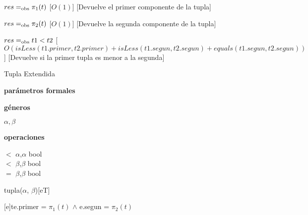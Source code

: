 \begin{Interfaz}
	{$res =_{\mathrm{obs}} \pi_1 (t)$}
	[$O(1)$]
	[Devuelve el primer componente de la tupla]

	{$res =_{\mathrm{obs}} \pi_2 (t)$}
	[$O(1)$]
	[Devuelve la segunda componente de la tupla]

	{$res =_{\mathrm{obs}} t1 < t2$}
	[$O(isLess(t1.primer, t2.primer) + isLess(t1.segun, t2.segun) + equals(t1.segun, t2.segun))$]
	[Devuelve si la primer tupla es menor a la segunda]


	\begin{tad}{Tupla Extendida}
	\parskip=0pt

	\textbf{parámetros formales}\parindent\\
	\parbox{1.7cm}{\textbf{géneros}}$\alpha,\beta$\\
	\parbox{\parindent+1.7cm}{\textbf{operaciones}}\parbox[t]{\textwidth-\parindent-1.7cm}{
		\tadOperacionInline
		{\puntito $<$ \puntito}
		{$\alpha$,$\alpha$}
		{bool}\\
		\tadOperacionInline
		{\puntito $<$ \puntito}
		{$\beta$,$\beta$}
		{bool}\\
		\tadOperacionInline
		{\puntito $=$ \puntito}
		{$\beta$,$\beta$}
		{bool}
	}


	
	\tadAxiomas


	\end{tad}

\end{Interfaz}


\begin{Representacion}

	\begin{Estructura}{tupla($\alpha$, $\beta$)}[eT]
		\begin{Tupla}[eT]
		\end{Tupla}
	\end{Estructura}





	{t}{e.primer = $\pi_1 (t)$ $\land$ e.segun = $\pi_2 (t)$}
\end{Representacion}

